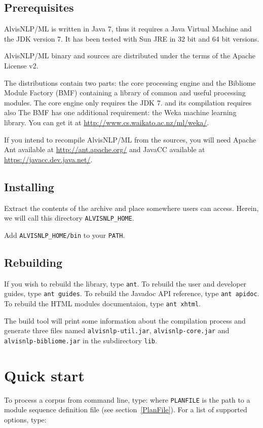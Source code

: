 \documentclass[a4paper]{book}
\begin{document}
\subsection{Prerequisites}
AlvisNLP/ML is written in Java 7, thus it requires a Java Virtual Machine and the JDK version 7.
It has been tested with Sun JRE in 32 bit and 64 bit versions.

AlvisNLP/ML binary and sources are distributed under the terms of the Apache License v2.

The distributions contain two parts: the core processing engine and the Bibliome Module Factory (BMF) containing a library of common and useful processing modules.
The core engine only requires the JDK 7. and its compilation requires also 
The BMF has one additional requirement: the Weka machine learning library.
You can get it at \url{http://www.cs.waikato.ac.nz/ml/weka/}.

If you intend to recompile AlvisNLP/ML from the sources, you will need Apache Ant available at \url{http://ant.apache.org/} and JavaCC available at \url{https://javacc.dev.java.net/}.

\subsection{Installing}

Extract the contents of the archive and place somewhere users can access.
Herein, we will call this directory \texttt{ALVISNLP\_HOME}.

Add \texttt{ALVISNLP\_HOME/bin} to your \texttt{PATH}.

\subsection{Rebuilding}
If you wish to rebuild the library, type \texttt{ant}.
To rebuild the user and developer guides, type \texttt{ant guides}.
To rebuild the Javadoc API reference, type \texttt{ant apidoc}.
To rebuild the HTML modules documentaion, type \texttt{ant xhtml}.

The build tool will print some information about the compilation process and generate three files named \texttt{alvisnlp-util.jar}, \texttt{alvisnlp-core.jar} and \texttt{alvisnlp-bibliome.jar} in the subdirectory \texttt{lib}.

\section{Quick start}
To process a corpus from command line, type:
where \texttt{PLANFILE} is the path to a module sequence definition file (see section~\ref{PlanFile}).
For a list of supported options, type:
\end{document}
